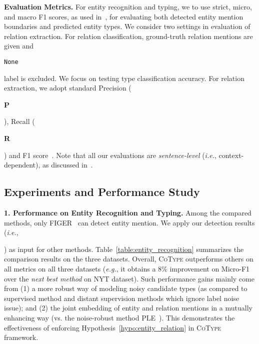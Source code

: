 \documentclass[letterpaper]{sig-alternate-2013}
\def\ie{{\sl i.e.}}
\def\eg{{\sl e.g.}}
\begin{document}
\smallskip\noindent
\textsf{\small \textbf{Evaluation Metrics.}}
For entity recognition and typing, we to use strict, micro, and macro F1 scores, as used in~\cite{ling2012fine}, for evaluating both detected entity mention boundaries and predicted entity types.
We consider two settings in evaluation of relation extraction. For relation classification, ground-truth relation mentions are given and \begin{small}\texttt{None}\end{small} label is excluded. We focus on testing type classification accuracy.
For relation extraction, we adopt standard Precision (\begin{small}\textbf{P}\end{small}), Recall (\begin{small}\textbf{R}\end{small}) and F1 score~\cite{mooney2005subsequence,bach2007review}. Note that all our evaluations are \textit{sentence-level} (\ie, context-dependent), as discussed in~\cite{hoffmann2011multiR}.


\subsection{Experiments and Performance Study}
\label{subsec:performance_comparison}
\noindent
\textsf{\small\textbf{1. Performance on Entity Recognition and Typing.}}
Among the compared methods, only FIGER~\cite{ling2012fine} can detect entity mention. We apply our detection results (\ie, \begin{small}\end{small}) as input for other methods. Table~\ref{table:entity_recognition} summarizes the comparison results on the three datasets. Overall, \textsc{CoType} outperforms others on all metrics on all three datasets (\eg, it obtains a 8\% improvement on Micro-F1 over the \textit{next best method} on NYT dataset). Such performance gains mainly come from (1) a more robust way of modeling noisy candidate types (as compared to supervised method and distant supervision methods which ignore label noise issue); and (2) the joint embedding of entity and relation mentions in a mutually enhancing way (vs. the noise-robust method PLE~\cite{ren2016label}). This demonstrates the effectiveness of enforcing Hypothesis~\ref{hypo:entity_relation} in \textsc{CoType} framework.
\end{document}
